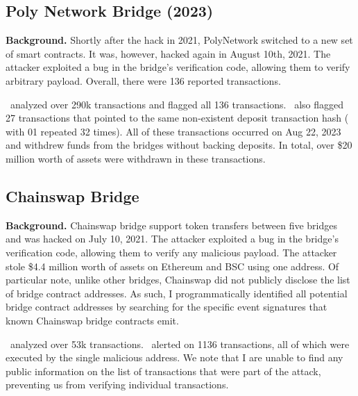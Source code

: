 


\subsection{Poly Network Bridge (2023)}
\textbf{Background.} Shortly after the hack in 2021,
PolyNetwork switched to a new set of smart contracts.  It was,
however, hacked again in August 10th, 2021. The attacker exploited a
bug in the bridge's verification code, allowing them to verify
arbitrary payload. Overall, there were 136 reported transactions.

 \offlinetool~analyzed over 290k transactions and flagged all 136 transactions. \offlinetool~also flagged 27 transactions that pointed to the same non-existent deposit transaction hash ( with 01 repeated 32 times).
All of these transactions occurred on Aug 22, 2023 and withdrew funds from the bridges without backing deposits. In total, over \$20 million worth of assets were withdrawn in these transactions.


\subsection{Chainswap Bridge}
\textbf{Background.} Chainswap bridge support token transfers between five bridges and 
was hacked on July 10, 2021. The attacker exploited a bug in the bridge's verification code, allowing them to verify any malicious payload. The attacker stole \$4.4 million worth of assets on Ethereum and BSC using one address. Of particular note, unlike other bridges, Chainswap did not publicly disclose the list of bridge contract addresses. 
As such, I programmatically identified all potential bridge contract addresses by searching for the specific event signatures that known Chainswap bridge contracts emit.

 \offlinetool~analyzed over 53k transactions. \offlinetool~alerted on 1136 transactions, all of which were executed by the single malicious address. We note that I are unable to find any public information on the list of transactions that were part of the attack, preventing us from verifying individual transactions.

